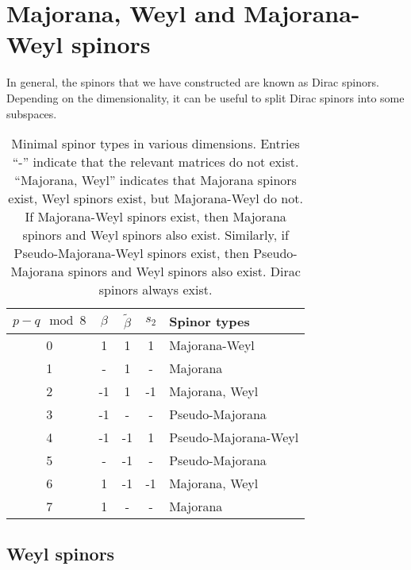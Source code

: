 \documentclass[11pt]{article}
\newcommand{\betat}{\tilde{\beta}}
\begin{document}

\section{Majorana, Weyl and Majorana-Weyl spinors}\label{sec:subtypes}

In general, the spinors that we have constructed are known as Dirac spinors.
Depending on the dimensionality, it can be useful to split Dirac spinors into some subspaces.


\begin{table}
  \centering
  \begin{tabular}{ccccl}
  \toprule
    \(p-q \mod 8\) & \(\beta\) & \(\betat\) & \(s_2\) & Spinor types  \\
  \midrule
    0 & 1  & 1  & 1  & Majorana-Weyl        \\
    1 & -  & 1  & -  & Majorana             \\
    2 & -1 & 1  & -1 & Majorana, Weyl       \\
    3 & -1 & -  & -  & Pseudo-Majorana      \\
    4 & -1 & -1 & 1  & Pseudo-Majorana-Weyl \\
    5 & -  & -1 & -  & Pseudo-Majorana      \\
    6 & 1  & -1 & -1 & Majorana, Weyl       \\
    7 & 1  & -  & -  & Majorana             \\
  \bottomrule
  \end{tabular}
  \caption{Minimal spinor types in various dimensions.
  Entries ``-'' indicate that the relevant matrices do not exist.
  ``Majorana, Weyl'' indicates that Majorana spinors exist, Weyl spinors exist, but Majorana-Weyl do not.
  If Majorana-Weyl spinors exist, then Majorana spinors and Weyl spinors also exist.
  Similarly, if Pseudo-Majorana-Weyl spinors exist, then Pseudo-Majorana spinors and Weyl spinors also exist.
  Dirac spinors always exist.
  }\label{tab:types}
\end{table}



\subsection{Weyl spinors}\label{sec:weyl}
\end{document}
